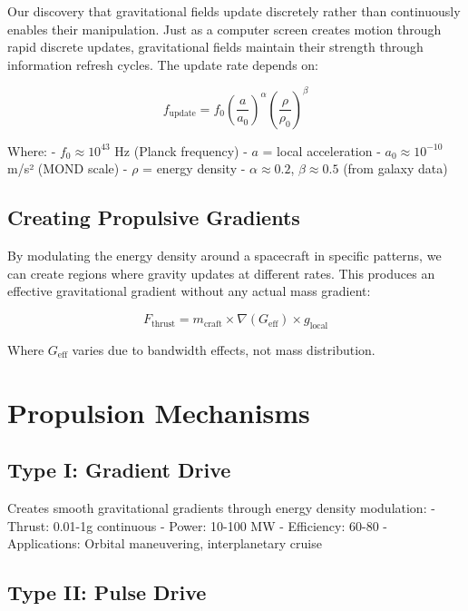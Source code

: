 \documentclass[12pt,letterpaper]{book}
\theoremstyle{definition}
\theoremstyle{plain}
\theoremstyle{remark}
\begin{document}
Our discovery that gravitational fields update discretely rather than continuously enables their manipulation. Just as a computer screen creates motion through rapid discrete updates, gravitational fields maintain their strength through information refresh cycles. The update rate depends on:

\begin{equation}
f_{\text{update}} = f_0 \left(\frac{a}{a_0}\right)^{\alpha} \left(\frac{\rho}{\rho_0}\right)^{\beta}
\end{equation}

Where:
- $f_0 \approx 10^{43}$ Hz (Planck frequency)
- $a$ = local acceleration 
- $a_0 \approx 10^{-10}$ m/s² (MOND scale)
- $\rho$ = energy density
- $\alpha \approx 0.2$, $\beta \approx 0.5$ (from galaxy data)

\subsection{Creating Propulsive Gradients}

By modulating the energy density around a spacecraft in specific patterns, we can create regions where gravity updates at different rates. This produces an effective gravitational gradient without any actual mass gradient:

\begin{equation}
F_{\text{thrust}} = m_{\text{craft}} \times \nabla(G_{\text{eff}}) \times g_{\text{local}}
\end{equation}

Where $G_{\text{eff}}$ varies due to bandwidth effects, not mass distribution.

\section{Propulsion Mechanisms}

\subsection{Type I: Gradient Drive}

Creates smooth gravitational gradients through energy density modulation:
- Thrust: 0.01-1g continuous
- Power: 10-100 MW
- Efficiency: 60-80%
- Applications: Orbital maneuvering, interplanetary cruise

\subsection{Type II: Pulse Drive}
\end{document}
